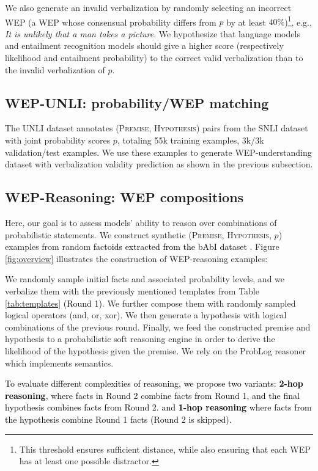 \documentclass[11pt]{article}
\def \thecolor {black}
\newcommand{\blue}[1]{\textcolor{\thecolor}{#1}}
\begin{document}
We also generate an invalid verbalization by randomly selecting an incorrect WEP (a WEP whose consensual probability differs from $p$ by at least $40\%$)\footnote{This threshold ensures sufficient distance, while also ensuring that each WEP has at least one possible distractor.}, e.g., \textit{It is unlikely that a man takes a picture}. We hypothesize that language models and entailment recognition models should give a higher score (respectively likelihood and entailment probability) to the correct valid verbalization than to the invalid verbalization of $p$.

\subsection{WEP-UNLI: probability/WEP matching}

The UNLI dataset annotates (\textsc{Premise}, \textsc{Hypothesis}) pairs from the SNLI dataset \citep{bowman-etal-2015-large} with joint probability scores $p$, totaling 55k training examples, 3k/3k validation/test examples. We use these examples to generate WEP-understanding dataset with verbalization validity prediction as shown in the previous subsection.

\subsection{WEP-Reasoning: WEP compositions}  
Here, our goal is to assess models' ability to reason over combinations of probabilistic statements. We construct synthetic (\textsc{Premise}, \textsc{Hypothesis}, $p$) examples from random \blue{factoids extracted from the bAbI dataset \citep{weston2015towards}}. Figure \ref{fig:overview} illustrates the construction of WEP-reasoning examples:

We randomly sample initial facts and associated probability levels, and we verbalize them with the previously mentioned templates from Table \ref{tab:templates} \blue{(Round 1)}.
We further compose them with randomly sampled logical operators (and, or, xor). We then generate a hypothesis with logical combinations of the previous round. Finally, we feed the constructed premise and hypothesis to a probabilistic soft reasoning engine in order to derive the likelihood of the hypothesis given the premise. We rely on the ProbLog \cite{de2007problog} reasoner which implements \citet{Dantsin} semantics.

\blue{To evaluate different complexities of reasoning, we propose two variants: \textbf{2-hop reasoning}, where facts in Round 2 combine facts from Round 1, and the final hypothesis combines facts from Round 2. and \textbf{1-hop reasoning} where facts from the hypothesis combine Round 1 facts (Round 2 is skipped).}
\end{document}
